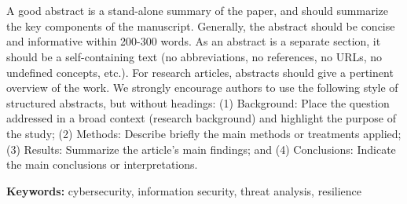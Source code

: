 \chapter*{}

A good abstract is a stand-alone summary of the paper, and should summarize the key components of the manuscript. Generally, the abstract should be concise and informative within 200-300 words. As an abstract is a separate section, it should be a self-containing text (no abbreviations, no references, no URLs, no undefined concepts, etc.). For research articles, abstracts should give a pertinent overview of the work. We strongly encourage authors to use the following style of structured abstracts, but without headings: (1) Background: Place the question addressed in a broad context (research background) and highlight the purpose of the study; (2) Methods: Describe briefly the main methods or treatments applied; (3) Results: Summarize the article's main findings; and (4) Conclusions: Indicate the main conclusions or interpretations.

\textbf{Keywords:} cybersecurity, information security, threat analysis, resilience